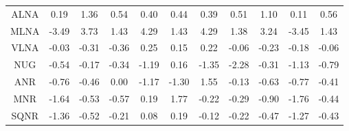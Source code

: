 \begin{longtable}{ | c || c | c | c | c | c | c | c | c | c || c |}
ALNA &  \cellcolor[HTML]{F7F7FF} 0.19 &  \cellcolor[HTML]{DFDFFF} 1.36 &  \cellcolor[HTML]{EFEFFF} 0.54 &  \cellcolor[HTML]{F7F7FF} 0.40 &  \cellcolor[HTML]{F7F7FF} 0.44 &  \cellcolor[HTML]{F7F7FF} 0.39 &  \cellcolor[HTML]{EFEFFF} 0.51 &  \cellcolor[HTML]{E7E7FF} 1.10 &  \cellcolor[HTML]{FFFFFF} 0.11 &  \cellcolor[HTML]{EFEFFF} 0.56 \\
MLNA &  \cellcolor[HTML]{FFA7A7} -3.49 &  \cellcolor[HTML]{9F9FFF} 3.73 &  \cellcolor[HTML]{DFDFFF} 1.43 &  \cellcolor[HTML]{8F8FFF} 4.29 &  \cellcolor[HTML]{DFDFFF} 1.43 &  \cellcolor[HTML]{9797FF} 4.29 &  \cellcolor[HTML]{DFDFFF} 1.38 &  \cellcolor[HTML]{AFAFFF} 3.24 &  \cellcolor[HTML]{FFA7A7} -3.45 &  \cellcolor[HTML]{DFDFFF} 1.43 \\
VLNA &  \cellcolor[HTML]{FFFFFF} -0.03 &  \cellcolor[HTML]{FFF7F7} -0.31 &  \cellcolor[HTML]{FFF7F7} -0.36 &  \cellcolor[HTML]{F7F7FF} 0.25 &  \cellcolor[HTML]{FFFFFF} 0.15 &  \cellcolor[HTML]{F7F7FF} 0.22 &  \cellcolor[HTML]{FFFFFF} -0.06 &  \cellcolor[HTML]{FFF7F7} -0.23 &  \cellcolor[HTML]{FFF7F7} -0.18 &  \cellcolor[HTML]{FFFFFF} -0.06 \\
NUG &  \cellcolor[HTML]{FFEFEF} -0.54 &  \cellcolor[HTML]{FFF7F7} -0.17 &  \cellcolor[HTML]{FFF7F7} -0.34 &  \cellcolor[HTML]{FFDFDF} -1.19 &  \cellcolor[HTML]{F7F7FF} 0.16 &  \cellcolor[HTML]{FFDFDF} -1.35 &  \cellcolor[HTML]{FFC7C7} -2.28 &  \cellcolor[HTML]{FFF7F7} -0.31 &  \cellcolor[HTML]{FFDFDF} -1.13 &  \cellcolor[HTML]{FFE7E7} -0.79 \\
ANR &  \cellcolor[HTML]{FFEFEF} -0.76 &  \cellcolor[HTML]{FFF7F7} -0.46 &  \cellcolor[HTML]{FFFFFF} 0.00 &  \cellcolor[HTML]{FFDFDF} -1.17 &  \cellcolor[HTML]{FFDFDF} -1.30 &  \cellcolor[HTML]{D7D7FF} 1.55 &  \cellcolor[HTML]{FFFFFF} -0.13 &  \cellcolor[HTML]{FFEFEF} -0.63 &  \cellcolor[HTML]{FFEFEF} -0.77 &  \cellcolor[HTML]{FFF7F7} -0.41 \\
MNR &  \cellcolor[HTML]{FFD7D7} -1.64 &  \cellcolor[HTML]{FFEFEF} -0.53 &  \cellcolor[HTML]{FFEFEF} -0.57 &  \cellcolor[HTML]{F7F7FF} 0.19 &  \cellcolor[HTML]{CFCFFF} 1.77 &  \cellcolor[HTML]{FFF7F7} -0.22 &  \cellcolor[HTML]{FFF7F7} -0.29 &  \cellcolor[HTML]{FFE7E7} -0.90 &  \cellcolor[HTML]{FFCFCF} -1.76 &  \cellcolor[HTML]{FFF7F7} -0.44 \\
SQNR &  \cellcolor[HTML]{FFDFDF} -1.36 &  \cellcolor[HTML]{FFEFEF} -0.52 &  \cellcolor[HTML]{FFF7F7} -0.21 &  \cellcolor[HTML]{FFFFFF} 0.08 &  \cellcolor[HTML]{F7F7FF} 0.19 &  \cellcolor[HTML]{FFFFFF} -0.12 &  \cellcolor[HTML]{FFF7F7} -0.22 &  \cellcolor[HTML]{FFF7F7} -0.47 &  \cellcolor[HTML]{FFDFDF} -1.27 &  \cellcolor[HTML]{FFF7F7} -0.43 \\

\end{longtable}
